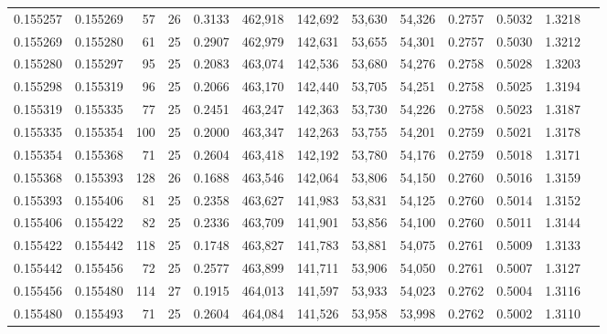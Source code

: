\begin{tabular}{rrrrrrrrrrrrr}
0.155257 & 0.155269 &    57 &  26 &                                     0.3133 & 462,918 & 142,692 &  53,630 &  54,326 & 0.2757 & 0.5032 & 1.3218 \\
0.155269 & 0.155280 &    61 &  25 &                                     0.2907 & 462,979 & 142,631 &  53,655 &  54,301 & 0.2757 & 0.5030 & 1.3212 \\
0.155280 & 0.155297 &    95 &  25 &                                     0.2083 & 463,074 & 142,536 &  53,680 &  54,276 & 0.2758 & 0.5028 & 1.3203 \\
0.155298 & 0.155319 &    96 &  25 &                                     0.2066 & 463,170 & 142,440 &  53,705 &  54,251 & 0.2758 & 0.5025 & 1.3194 \\
0.155319 & 0.155335 &    77 &  25 &                                     0.2451 & 463,247 & 142,363 &  53,730 &  54,226 & 0.2758 & 0.5023 & 1.3187 \\
0.155335 & 0.155354 &   100 &  25 &                                     0.2000 & 463,347 & 142,263 &  53,755 &  54,201 & 0.2759 & 0.5021 & 1.3178 \\
0.155354 & 0.155368 &    71 &  25 &                                     0.2604 & 463,418 & 142,192 &  53,780 &  54,176 & 0.2759 & 0.5018 & 1.3171 \\
0.155368 & 0.155393 &   128 &  26 &                                     0.1688 & 463,546 & 142,064 &  53,806 &  54,150 & 0.2760 & 0.5016 & 1.3159 \\
0.155393 & 0.155406 &    81 &  25 &                                     0.2358 & 463,627 & 141,983 &  53,831 &  54,125 & 0.2760 & 0.5014 & 1.3152 \\
0.155406 & 0.155422 &    82 &  25 &                                     0.2336 & 463,709 & 141,901 &  53,856 &  54,100 & 0.2760 & 0.5011 & 1.3144 \\
0.155422 & 0.155442 &   118 &  25 &                                     0.1748 & 463,827 & 141,783 &  53,881 &  54,075 & 0.2761 & 0.5009 & 1.3133 \\
0.155442 & 0.155456 &    72 &  25 &                                     0.2577 & 463,899 & 141,711 &  53,906 &  54,050 & 0.2761 & 0.5007 & 1.3127 \\
0.155456 & 0.155480 &   114 &  27 &                                     0.1915 & 464,013 & 141,597 &  53,933 &  54,023 & 0.2762 & 0.5004 & 1.3116 \\
0.155480 & 0.155493 &    71 &  25 &                                     0.2604 & 464,084 & 141,526 &  53,958 &  53,998 & 0.2762 & 0.5002 & 1.3110 \\

\end{tabular}
